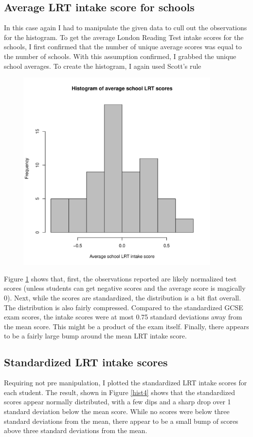 \documentclass{article}
\begin{document}
\subsection{Average LRT intake score for schools}
In this case again I had to manipulate the given data to cull out the observations for the histogram. To get the average London Reading Test intake scores for the schools, I first confirmed that the number of unique average scores was equal to the number of schools. With this assumption confirmed, I grabbed the unique school averages. To create the histogram, I again used Scott's rule
\begin{figure}[H]
\centering
\includegraphics[width = 4in]{figures/histogram_3.pdf}
\caption{}
\label{hist3}
\end{figure}

Figure \ref{hist3} shows that, first, the observations reported are likely normalized test scores (unless students can get negative scores and the average score is magically 0). Next, while the scores are standardized, the distribution is a bit flat overall. The distribution is also fairly compressed. Compared to the standardized GCSE exam scores, the intake scores were at most 0.75 standard deviations away from the mean score. This might be a product of the exam itself. Finally, there appears to be a fairly large bump around the mean LRT intake score.

\subsection{Standardized LRT intake scores}
Requiring not pre manipulation, I plotted the standardized LRT intake scores for each student. The result, shown in Figure \ref{hist4} shows that the standardized scores appear normally distributed, with a few dips and a sharp drop over 1 standard deviation below the mean score. While no scores were below three standard deviations from the mean, there appear to be a small bump of scores above three standard deviations from the mean.
\end{document}

